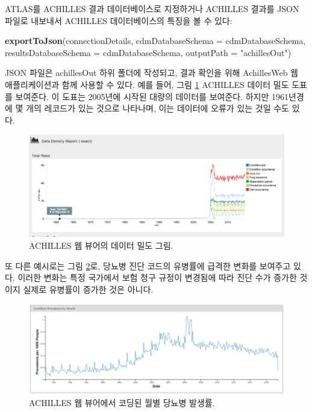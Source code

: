 \documentclass[10.5pt]{book}
\newenvironment{Shaded}{\begin{snugshade}}{\end{snugshade}}
\newcommand{\KeywordTok}[1]{\textcolor[rgb]{0.13,0.29,0.53}{\textbf{#1}}}
\newcommand{\DataTypeTok}[1]{\textcolor[rgb]{0.13,0.29,0.53}{#1}}
\newcommand{\StringTok}[1]{\textcolor[rgb]{0.31,0.60,0.02}{#1}}
\newcommand{\NormalTok}[1]{#1}
\theoremstyle{definition}
\theoremstyle{definition}
\theoremstyle{definition}
\theoremstyle{remark}
\begin{document}
ATLAS를 ACHILLES 결과 데이터베이스로 지정하거나 ACHILLES 결과를 JSON
파일로 내보내서 ACHILLES 데이터베이스의 특징을 볼 수 있다:

\begin{Shaded}
\begin{Highlighting}[]
\KeywordTok{exportToJson}\NormalTok{(connectionDetails,}
             \DataTypeTok{cdmDatabaseSchema =}\NormalTok{ cdmDatabaseSchema,}
             \DataTypeTok{resultsDatabaseSchema =}\NormalTok{ cdmDatabaseSchema,}
             \DataTypeTok{outputPath =} \StringTok{"achillesOut"}\NormalTok{)}
\end{Highlighting}
\end{Shaded}

JSON 파일은 achillesOut 하위 폴더에 작성되고, 결과 확인을 위해
AchillesWeb 웹 애플리케이션과 함께 사용할 수 있다. 예를 들어, 그림
\ref{fig:achillesDataDensity} ACHILLES 데이터 밀도 도표를 보여준다. 이
도표는 2005년에 시작된 대량의 데이터를 보여준다. 하지만 1961년경에 몇
개의 레코드가 있는 것으로 나타나며, 이는 데이터에 오류가 있는 것일 수도
있다.

\begin{figure}

{\centering \includegraphics[width=1\linewidth]{images/DataQuality/achillesDataDensity} 

}

\caption{ACHILLES 웹 뷰어의 데이터 밀도 그림.}\label{fig:achillesDataDensity}
\end{figure}

또 다른 예시로는 그림 \ref{fig:achillesCodeChange}로, 당뇨병 진단 코드의
유병률에 급격한 변화를 보여주고 있다. 이러한 변화는 특정 국가에서 보험
청구 규정이 변경됨에 따라 진단 수가 증가한 것이지 실제로 유병률이 증가한
것은 아니다.

\begin{figure}

{\centering \includegraphics[width=1\linewidth]{images/DataQuality/achillesCodeChange} 

}

\caption{ACHILLES 웹 뷰어에서 코딩된 월별 당뇨병 발생률.}\label{fig:achillesCodeChange}
\end{figure}
\end{document}
